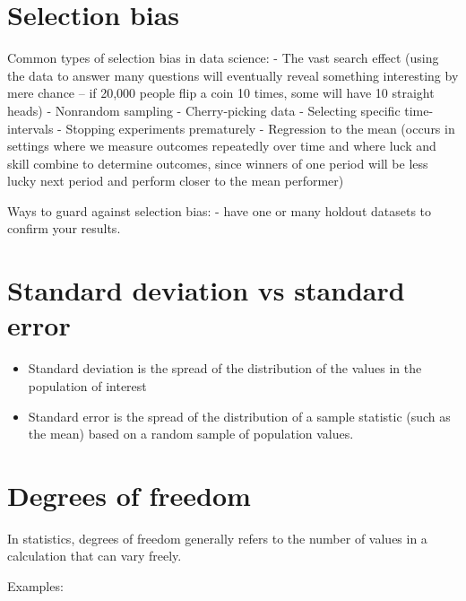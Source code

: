 \documentclass[
  letterpaper,
  DIV=11,
  numbers=noendperiod]{scrreprt}
\begin{document}
\hypertarget{selection-bias}{%
\section{Selection bias}\label{selection-bias}}

Common types of selection bias in data science: - The vast search effect
(using the data to answer many questions will eventually reveal
something interesting by mere chance -- if 20,000 people flip a coin 10
times, some will have 10 straight heads) - Nonrandom sampling -
Cherry-picking data - Selecting specific time-intervals - Stopping
experiments prematurely - Regression to the mean (occurs in settings
where we measure outcomes repeatedly over time and where luck and skill
combine to determine outcomes, since winners of one period will be less
lucky next period and perform closer to the mean performer)

Ways to guard against selection bias: - have one or many holdout
datasets to confirm your results.

\hypertarget{standard-deviation-vs-standard-error}{%
\section{Standard deviation vs standard
error}\label{standard-deviation-vs-standard-error}}

\begin{itemize}
\item
  Standard deviation is the spread of the distribution of the values in
  the population of interest
\item
  Standard error is the spread of the distribution of a sample statistic
  (such as the mean) based on a random sample of population values.
\end{itemize}

\hypertarget{degrees-of-freedom}{%
\section{Degrees of freedom}\label{degrees-of-freedom}}

In statistics, degrees of freedom generally refers to the number of
values in a calculation that can vary freely.

Examples:
\end{document}
